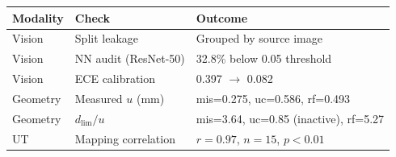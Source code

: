 \begin{tabular}{llp{7cm}}
\toprule
Modality & Check & Outcome \\
\midrule
Vision & Split leakage & Grouped by source image \\
Vision & NN audit (ResNet-50) & 32.8\% below 0.05 threshold \\
Vision & ECE calibration & 0.397 $\to$ 0.082 \\
Geometry & Measured $u$ (mm) & mis=0.275, uc=0.586, rf=0.493 \\
Geometry & $d_{{\mathrm{{lim}}}}/u$ & mis=3.64, uc=0.85 (inactive), rf=5.27 \\
UT & Mapping correlation & $r=0.97$, $n=15$, $p< 0.01$ \\
\bottomrule
\end{tabular}